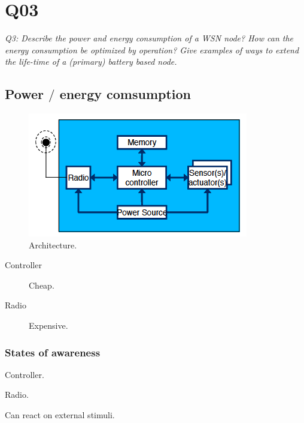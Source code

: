 \chapter{Q03}
\emph{Q3: Describe the power and energy consumption of a WSN node? How can the
energy consumption be optimized by operation? Give examples of ways to extend
the life-time of a (primary) battery based node.}

\section{Power $\slash$ energy comsumption}

\begin{figure}[h]
  \centering
  \includegraphics[scale=0.5]{img/moteAnatomy.png}
  \caption{Architecture.}
\end{figure}

\begin{description}
\item[Controller] Cheap.
\item[Radio] Expensive.
\end{description}

\subsection{States of awareness}

\begin{description}
\item Controller.
\item Radio.
\item Can react on external stimuli.
\end{description}

